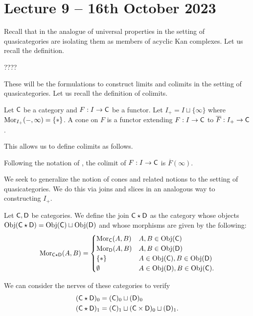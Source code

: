 \section{Lecture 9 -- 16th October 2023}
Recall that in the analogue of universal properties in the setting of quasicategories are isolating them as members of acyclic Kan complexes. Let us recall the definition. 
\begin{definition}
  ????
\end{definition}
These will be the formulations to construct limits and colimits in the setting of quasicategories. Let us recall the definition of colimits. 
\begin{definition}\label{def: cone v2}
  Let $\mathsf{C}$ be a category and $F:I\to\mathsf{C}$ be a functor. Let $I_{+}=I\sqcup\{\infty\}$ where $\mathrm{Mor}_{I_{+}}(-,\infty)=\{*\}$. A cone on $F$ is a functor extending $F:I\to \mathsf{C}$ to $\overline{F}:I_{+}\to\mathsf{C}$. 
\end{definition}
This allows us to define colimits as follows. 
\begin{definition}[Colimit]
  Following the notation of , the colimit of $F:I\to \mathsf{C}$ is $\overline{F}(\infty)$. 
\end{definition}
We seek to generalize the notion of cones and related notions to the setting of quasicategories. We do this via joins and slices in an analogous way to constructing $I_{+}$. 
\begin{definition}[Joins]
  Let $\mathsf{C},\mathsf{D}$ be categories. We define the join $\mathsf{C}\star\mathsf{D}$ as the category whose objects $\mathrm{Obj}(\mathsf{C}\star\mathsf{D})=\mathrm{Obj}(\mathsf{C})\sqcup\mathrm{Obj}(\mathsf{D})$ and whose morphisms are given by the following:
  $$\mathrm{Mor}_{\mathsf{C}\star\mathsf{D}}(A,B)=\begin{cases}
    \mathrm{Mor}_{\mathsf{C}}(A,B) & A,B\in\mathrm{Obj}(\mathsf{C}) \\
    \mathrm{Mor}_{\mathsf{D}}(A,B) & A,B\in\mathrm{Obj}(\mathsf{D}) \\
    \{*\} & A\in\mathrm{Obj}(\mathsf{C}), B\in\mathrm{Obj}(\mathsf{D}) \\
    \emptyset & A\in\mathrm{Obj}(\mathsf{D}), B\in\mathrm{Obj}(\mathsf{C}).
  \end{cases}$$
\end{definition}
We can consider the nerves of these categories to verify 
\begin{align*}
  (\mathsf{C}\star\mathsf{D})_{0} &= (\mathsf{C})_{0}\sqcup (\mathsf{D})_{0} \\
  (\mathsf{C}\star\mathsf{D})_{1} &= (\mathsf{C})_{1} \sqcup (\mathsf{C}\times\mathsf{D})_{0} \sqcup (\mathsf{D})_{1}. 
\end{align*}
